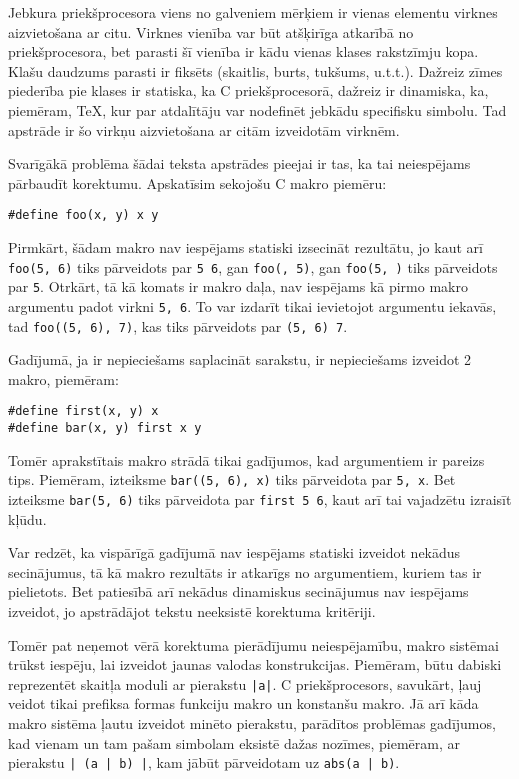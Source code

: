 Jebkura priekšprocesora viens no galveniem mērķiem ir vienas elementu virknes aizvietošana ar citu. Virknes vienība var būt atšķirīga atkarībā no priekšprocesora, bet parasti šī vienība ir kādu vienas klases rakstzīmju kopa. Klašu daudzums parasti ir fiksēts (skaitlis, burts, tukšums, u.t.t.). Dažreiz zīmes piederība pie klases ir statiska, ka C priekšprocesorā, dažreiz ir dinamiska, ka, piemēram, \TeX{}, kur par atdalītāju var nodefinēt jebkādu specifisku simbolu. Tad apstrāde ir šo virkņu aizvietošana ar citām izveidotām virknēm.

Svarīgākā problēma šādai teksta apstrādes pieejai ir tas, ka tai neiespējams pārbaudīt korektumu. Apskatīsim sekojošu C makro piemēru:
\begin{verbatim}
#define foo(x, y) x y
\end{verbatim}

Pirmkārt, šādam makro nav iespējams statiski izsecināt rezultātu, jo kaut arī \verb|foo(5, 6)| tiks pārveidots par \verb|5 6|, gan \verb|foo(, 5)|, gan \verb|foo(5, )| tiks pārveidots par \verb|5|. Otrkārt, tā kā komats ir makro daļa, nav iespējams kā pirmo makro argumentu padot virkni \verb|5, 6|. To var izdarīt tikai ievietojot argumentu iekavās, tad \verb|foo((5, 6), 7)|, kas tiks pārveidots par \verb|(5, 6) 7|.

Gadījumā, ja ir nepieciešams saplacināt sarakstu, ir nepieciešams izveidot 2 makro, piemēram:
\begin{verbatim}
#define first(x, y) x
#define bar(x, y) first x y
\end{verbatim}

Tomēr aprakstītais makro strādā tikai gadījumos, kad argumentiem ir pareizs tips. Piemēram, izteiksme \verb|bar((5, 6), x)| tiks pārveidota par \verb|5, x|. Bet izteiksme \verb|bar(5, 6)| tiks pārveidota par \verb|first 5 6|, kaut arī tai vajadzētu izraisīt kļūdu.

Var redzēt, ka vispārīgā gadījumā nav iespējams statiski izveidot nekādus secinājumus, tā kā makro rezultāts ir atkarīgs no argumentiem, kuriem tas ir pielietots. Bet patiesībā arī nekādus dinamiskus secinājumus nav iespējams izveidot, jo apstrādājot tekstu neeksistē korektuma kritēriji.

Tomēr pat neņemot vērā korektuma pierādījumu neiespējamību, makro sistēmai trūkst iespēju, lai izveidot jaunas valodas konstrukcijas. Piemēram, būtu dabiski reprezentēt skaitļa moduli ar pierakstu \verb/|a|/. C priekšprocesors, savukārt, ļauj veidot tikai prefiksa formas funkciju makro un konstanšu makro. Jā arī kāda makro sistēma ļautu izveidot minēto pierakstu, parādītos problēmas gadījumos, kad vienam un tam pašam simbolam eksistē dažas nozīmes, piemēram, ar pierakstu \verb/| (a | b) |/, kam jābūt pārveidotam uz \verb/abs(a | b)/.


